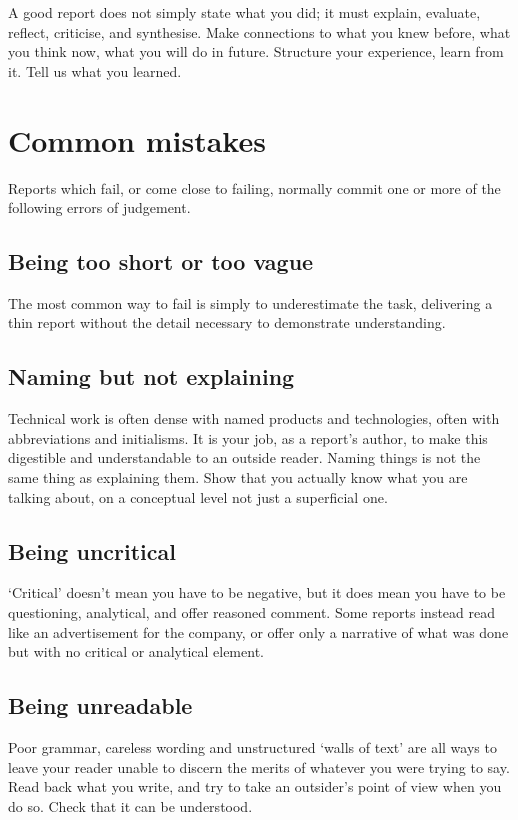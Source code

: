 \documentclass[british,12pt,a4paper]{report}
\begin{document}
A good report does not simply state what you did; it must explain, evaluate, reflect,
criticise, and synthesise. Make connections to what you knew before, what you think now, what you will do in future. Structure your experience, learn from it. Tell us what you learned.

\section{Common mistakes}

Reports which fail, or come close to failing, normally commit one or more of the following errors of judgement.

\subsection{Being too short or too vague}

The most common way to fail is simply to underestimate the task,
delivering a thin report without the detail necessary to demonstrate understanding.

\subsection{Naming but not explaining}

Technical work is often dense with named products and technologies,
often with abbreviations and initialisms. It is your job, as a report's author,
to make this digestible and understandable to an outside reader.
Naming things is not the same thing as explaining them.
Show that you actually know what you are talking about,
on a conceptual level not just a superficial one.

\subsection{Being uncritical}

`Critical' doesn't mean you have to be negative,
but it does mean you have to be questioning,
analytical, and offer reasoned comment.
Some reports instead read like an advertisement for the company,
or offer only a narrative of what was done but with no critical or analytical element.

\subsection{Being unreadable}

Poor grammar, careless wording and unstructured `walls of text' are all ways
to leave your reader unable to discern the merits of whatever you were trying to say.
Read back what you write, and try to take an outsider's point of view when you do so.
Check that it can be understood.
\end{document}
